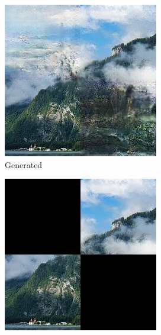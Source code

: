 \documentclass[sigconf]{acmart}
\begin{document}
\begin{figure}[h]
    \centering
    \begin{subfigure}[b]{0.3\linewidth}
        \includegraphics[width=\linewidth]{output2.png}
        \caption{Generated}
    \end{subfigure}
    \hfill
    \begin{subfigure}[b]{0.3\linewidth}
        \includegraphics[width=\linewidth]{input2.jpg}

\end{subfigure}
\end{figure}
\end{document}
